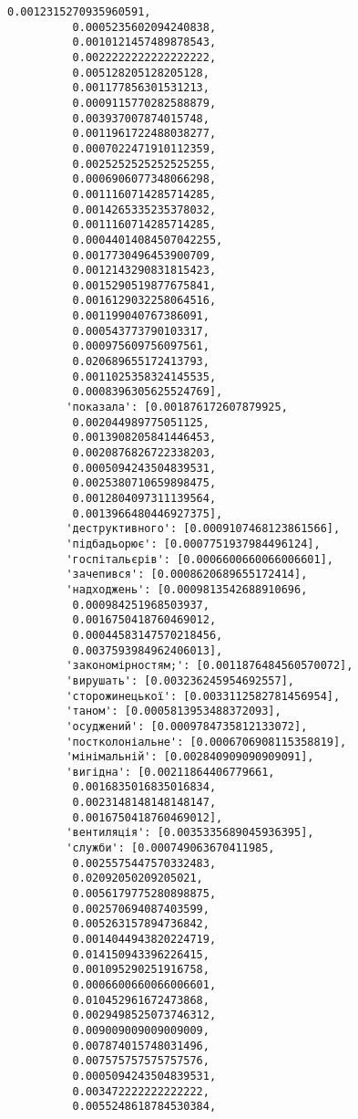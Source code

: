 \documentclass[11pt]{article}
\begin{document}
\begin{Verbatim}[commandchars=\\\{\}]
          0.0012315270935960591,
          0.0005235602094240838,
          0.0010121457489878543,
          0.0022222222222222222,
          0.005128205128205128,
          0.001177856301531213,
          0.0009115770282588879,
          0.003937007874015748,
          0.0011961722488038277,
          0.0007022471910112359,
          0.0025252525252525255,
          0.0006906077348066298,
          0.0011160714285714285,
          0.0014265335235378032,
          0.0011160714285714285,
          0.00044014084507042255,
          0.0017730496453900709,
          0.0012143290831815423,
          0.0015290519877675841,
          0.0016129032258064516,
          0.001199040767386091,
          0.000543773790103317,
          0.000975609756097561,
          0.020689655172413793,
          0.0011025358324145535,
          0.0008396305625524769],
         'показала': [0.001876172607879925,
          0.002044989775051125,
          0.0013908205841446453,
          0.0020876826722338203,
          0.0005094243504839531,
          0.0025380710659898475,
          0.0012804097311139564,
          0.0013966480446927375],
         'деструктивного': [0.0009107468123861566],
         'підбадьорює': [0.0007751937984496124],
         'госпітальєрів': [0.0006600660066006601],
         'зачепився': [0.0008620689655172414],
         'надходжень': [0.0009813542688910696,
          0.000984251968503937,
          0.0016750418760469012,
          0.00044583147570218456,
          0.0037593984962406013],
         'закономірностям;': [0.0011876484560570072],
         'вирушать': [0.003236245954692557],
         'сторожинецької': [0.0033112582781456954],
         'таном': [0.0005813953488372093],
         'осуджений': [0.0009784735812133072],
         'постколоніальне': [0.0006706908115358819],
         'мінімальній': [0.002840909090909091],
         'вигідна': [0.00211864406779661,
          0.0016835016835016834,
          0.0023148148148148147,
          0.0016750418760469012],
         'вентиляція': [0.0035335689045936395],
         'служби': [0.000749063670411985,
          0.0025575447570332483,
          0.02092050209205021,
          0.0056179775280898875,
          0.002570694087403599,
          0.005263157894736842,
          0.0014044943820224719,
          0.014150943396226415,
          0.001095290251916758,
          0.0006600660066006601,
          0.010452961672473868,
          0.0029498525073746312,
          0.009009009009009009,
          0.007874015748031496,
          0.007575757575757576,
          0.0005094243504839531,
          0.003472222222222222,
          0.0055248618784530384,

\end{Verbatim}
\end{document}
